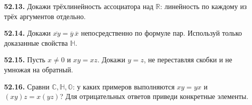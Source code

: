 \noindent\begin{minipage}[t]{\linewidth}\textbf{52.13.}\starmark{} Докажи трёхлинейность ассоциатора над \(\mathbb R\): линейность по каждому из трёх аргументов отдельно.\par\end{minipage}\par
\noindent\begin{minipage}[t]{\linewidth}\textbf{52.14.}\starmark{} Докажи \(\overline{xy}=\overline y\,\overline x\) непосредственно по формуле пар. Используй только доказанные свойства \(\mathbb H\).\par\end{minipage}\par
\noindent\begin{minipage}[t]{\linewidth}\textbf{52.15.}\starmark{} Пусть \(x\ne0\) и \(xy=xz\). Докажи \(y=z\), не переставляя скобки и не умножая на обратный.\par\end{minipage}\par
\noindent\begin{minipage}[t]{\linewidth}\textbf{52.16.}\starmark{} Сравни \(\mathbb C,\mathbb H,\mathbb O\): у каких примеров выполняются \(xy=yx\) и \((xy)z=x(yz)\)? Для отрицательных ответов приведи конкретные элементы.\par\end{minipage}\par
\endgroup
